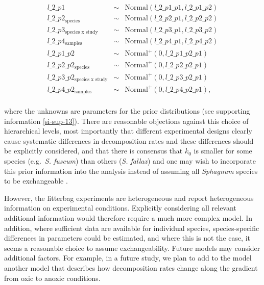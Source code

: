 \documentclass[bg, manuscript]{copernicus}
\begin{document}
\begin{equation}
\begin{aligned}
l\_2\_p1 & \sim & \text{Normal}(l\_2\_p1\_p1, l\_2\_p1\_p2)\\
l\_2\_p2_{\text{species}} & \sim & \text{Normal}(l\_2\_p2\_p1, l\_2\_p2\_p2)\\
l\_2\_p3_{\text{species x study}} & \sim & \text{Normal}(l\_2\_p3\_p1, l\_2\_p3\_p2)\\
l\_2\_p4_{\text{samples}} & \sim & \text{Normal}(l\_2\_p4\_p1, l\_2\_p4\_p2)\\
l\_2\_p1\_p2 & \sim & \text{Normal}^+(0, l\_2\_p1\_p2\_p1)\\
l\_2\_p2\_p2_{\text{species}} & \sim & \text{Normal}^+(0, l\_2\_p2\_p2\_p1)\\
l\_2\_p3\_p2_{\text{species x study}} & \sim & \text{Normal}^+(0, l\_2\_p3\_p2\_p1)\\
l\_2\_p4\_p2_{\text{samples}} & \sim & \text{Normal}^+(0, l\_2\_p4\_p2\_p1),\\
\label{eq:leaching-hierarchical-model-l0-2}
\end{aligned}
\end{equation}

where the unknowns are parameters for the prior distributions (see supporting information \ref{si-sup-13}). There are reasonable objections against this choice of hierarchical levels, most importantly that different experimental designs clearly cause systematic differences in decomposition rates and these differences should be explicitly considered, and that there is consensus that \(k_0\) is smaller for some species (e.g.~\emph{S. fuscum}) than others (\emph{S. fallax}) and one may wish to incorporate this prior information into the analysis instead of assuming all \emph{Sphagnum} species to be exchangeable \citep{Gelman.2014}.

However, the litterbag experiments are heterogeneous and report heterogeneous information on experimental conditions. Explicitly considering all relevant additional information would therefore require a much more complex model. In addition, where sufficient data are available for individual species, species-specific differences in parameters could be estimated, and where this is not the case, it seems a reasonable choice to assume exchangeability. Future models may consider additional factors. For example, in a future study, we plan to add to the model another model that describes how decomposition rates change along the gradient from oxic to anoxic conditions.
\end{document}
